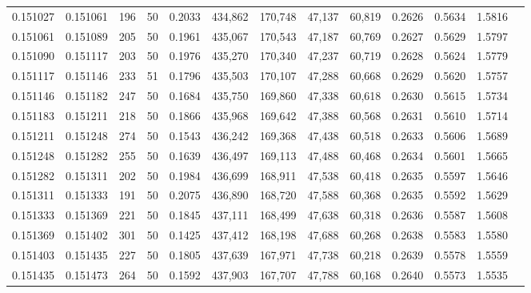 \begin{tabular}{rrrrrrrrrrrrr}
0.151027 & 0.151061 &   196 &  50 &                                     0.2033 & 434,862 & 170,748 &  47,137 &  60,819 & 0.2626 & 0.5634 & 1.5816 \\
0.151061 & 0.151089 &   205 &  50 &                                     0.1961 & 435,067 & 170,543 &  47,187 &  60,769 & 0.2627 & 0.5629 & 1.5797 \\
0.151090 & 0.151117 &   203 &  50 &                                     0.1976 & 435,270 & 170,340 &  47,237 &  60,719 & 0.2628 & 0.5624 & 1.5779 \\
0.151117 & 0.151146 &   233 &  51 &                                     0.1796 & 435,503 & 170,107 &  47,288 &  60,668 & 0.2629 & 0.5620 & 1.5757 \\
0.151146 & 0.151182 &   247 &  50 &                                     0.1684 & 435,750 & 169,860 &  47,338 &  60,618 & 0.2630 & 0.5615 & 1.5734 \\
0.151183 & 0.151211 &   218 &  50 &                                     0.1866 & 435,968 & 169,642 &  47,388 &  60,568 & 0.2631 & 0.5610 & 1.5714 \\
0.151211 & 0.151248 &   274 &  50 &                                     0.1543 & 436,242 & 169,368 &  47,438 &  60,518 & 0.2633 & 0.5606 & 1.5689 \\
0.151248 & 0.151282 &   255 &  50 &                                     0.1639 & 436,497 & 169,113 &  47,488 &  60,468 & 0.2634 & 0.5601 & 1.5665 \\
0.151282 & 0.151311 &   202 &  50 &                                     0.1984 & 436,699 & 168,911 &  47,538 &  60,418 & 0.2635 & 0.5597 & 1.5646 \\
0.151311 & 0.151333 &   191 &  50 &                                     0.2075 & 436,890 & 168,720 &  47,588 &  60,368 & 0.2635 & 0.5592 & 1.5629 \\
0.151333 & 0.151369 &   221 &  50 &                                     0.1845 & 437,111 & 168,499 &  47,638 &  60,318 & 0.2636 & 0.5587 & 1.5608 \\
0.151369 & 0.151402 &   301 &  50 &                                     0.1425 & 437,412 & 168,198 &  47,688 &  60,268 & 0.2638 & 0.5583 & 1.5580 \\
0.151403 & 0.151435 &   227 &  50 &                                     0.1805 & 437,639 & 167,971 &  47,738 &  60,218 & 0.2639 & 0.5578 & 1.5559 \\
0.151435 & 0.151473 &   264 &  50 &                                     0.1592 & 437,903 & 167,707 &  47,788 &  60,168 & 0.2640 & 0.5573 & 1.5535 \\

\end{tabular}
